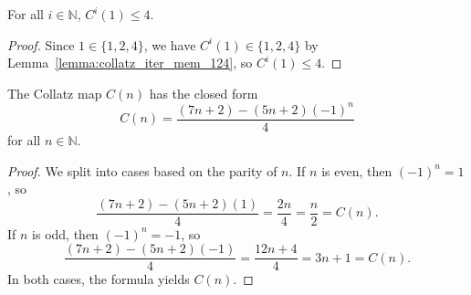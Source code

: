 \begin{lemma}\label{lemma:collatz_iter_one_le_four}\leanok
For all $i \in \mathbb{N}$, $C^i(1) \le 4$.
\end{lemma}
\begin{proof}\leanok
Since $1 \in \{1, 2, 4\}$, we have $C^i(1) \in \{1, 2, 4\}$ by Lemma~\ref{lemma:collatz_iter_mem_124}, so $C^i(1) \le 4$.
\end{proof}

\begin{lemma}\label{lemma:collatz_step_closed_form}\leanok
The Collatz map $C(n)$ has the closed form
\begin{equation}
    C(n) = \frac{(7n + 2) - (5n + 2)(-1)^n}{4}
\end{equation}
for all $n \in \mathbb{N}$.
\end{lemma}
\begin{proof}\leanok
We split into cases based on the parity of $n$.
If $n$ is even, then $(-1)^n = 1$, so
\begin{equation}
    \frac{(7n + 2) - (5n + 2)(1)}{4} = \frac{2n}{4} = \frac{n}{2} = C(n).
\end{equation}
If $n$ is odd, then $(-1)^n = -1$, so
\begin{equation}
    \frac{(7n + 2) - (5n + 2)(-1)}{4} = \frac{12n + 4}{4} = 3n + 1 = C(n).
\end{equation}
In both cases, the formula yields $C(n)$.
\end{proof}
